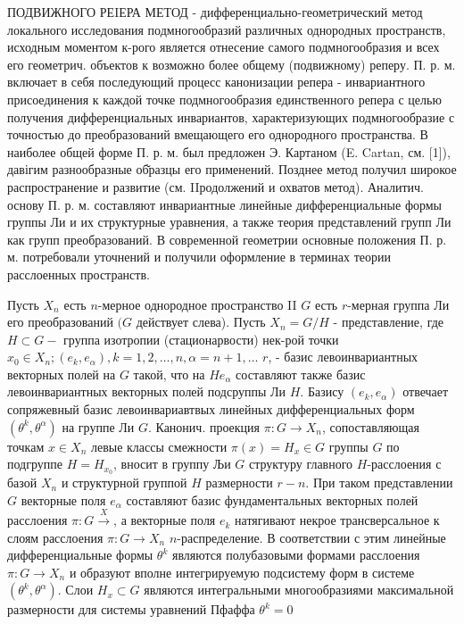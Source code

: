 \documentclass[10pt]{article}
\begin{document}
ПОДВИЖНОГО РЕIЕРА МЕТОД - дифференциально-геометрический метод локального исследования подмногообразий различных однородных пространств, исходным моментом к-рого является отнесение самого подмногообразия и всех его геометрич. объектов к возможно более общему (подвижному) реперу. П. р. м. включает в себя последующий процесс канонизации репера - инвариантного присоединения к каждой точке подмногообразия единственного репера с целью получения дифференциальных инвариантов, характеризующих подмногообразие с точностью до преобразований вмещающего его однородного пространства. В наиболее общей форме П. р. м. был предложен Э. Картаном (E. Cartan, см. [1]), давігим разнообразные об̆разцы его применений. Позднее метод получил широкое распространение и развитие (см. IIродолжений и охватов метод). Аналитич. основу П. р. м. составляют инвариантные линейные дифференциальные формы группы Ли и их структурные уравнения, а также теория представлений групп Ли как групп преобразований. В современной геометрии основные положения П. р. м. потребовали уточнений и получили оформление в терминах теории расслоенных пространств.



Пусть $X_{n}$ есть $n$-мерное однородное пространство II $G$ есть $r$-мерная группа Ли его преобразований $(G$ действует слева). Пусть $X_{n}=G / H$ - представление, где $H \subset G-$ группа изотропии (стационарвости) нек-рой точки $x_{0} \in X_{n} ;\left(e_{k}, e_{\alpha}\right), k=1,2, \ldots, n, \alpha=n+1, \ldots$ $r$, - базис левоинвариантных векторных полей на $G$ такой, что на $H e_{\alpha}$ составляют также базис левоинвариантных векторных полей подсруппы Ли $H$. Базису $\left(e_{k}, e_{\alpha}\right)$ отвечает сопряжевный базис левоинвариавтвых линейных дифференциальных форм $\left(\theta^{k}, \theta^{\alpha}\right)$ на группе Ли $G$. Канонич. проекция $\pi: G \rightarrow X_{n}$, сопоставляющая точкам $x \in X_{n}$ левые классы смежности $\pi(x)=H_{x} \in G$ группы $G$ по подгруппе $H=H_{x_{0}}$, вносит в группу Љи $G$ структуру главного $H$-расслоения с базой $X_{n}$ и структурной группой $H$ размерности $r-n$. При таком представлении $G$ векторные поля $e_{\alpha}$ составляют базис фундаментальных векторных полей расслоения $\pi: G \stackrel{X}{\rightarrow}$, а векторные поля $e_{k}$ натягивают некрое трансверсальное к слоям расслоения $\pi: G \rightarrow X_{n}$ $n$-распределение. В соответствии с этим линейные дифференциальные формы $\theta^{k}$ являются полубазовыми формами расслоения $\pi: G \rightarrow X_{n}$ и образуют вполне интегрируемую подсистему форм в системе $\left(\theta^{k}, \theta^{\alpha}\right)$. Слои $H_{x} \subset G$ являются интегральными многообразиями максимальной размерности для системы уравнений Пфаффа $\theta^{k}=0$
\end{document}
